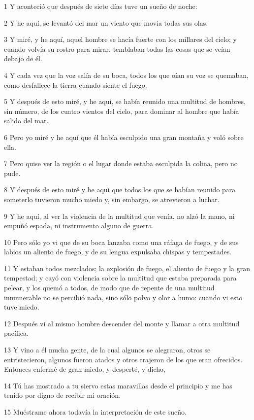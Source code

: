 \par 1 Y aconteció que después de siete días tuve un sueño de noche:
\par 2 Y he aquí, se levantó del mar un viento que movía todas sus olas.
\par 3 Y miré, y he aquí, aquel hombre se hacía fuerte con los millares del cielo; y cuando volvía su rostro para mirar, temblaban todas las cosas que se veían debajo de él.
\par 4 Y cada vez que la voz salía de su boca, todos los que oían su voz se quemaban, como desfallece la tierra cuando siente el fuego.
\par 5 Y después de esto miré, y he aquí, se había reunido una multitud de hombres, sin número, de los cuatro vientos del cielo, para dominar al hombre que había salido del mar.
\par 6 Pero yo miré y he aquí que él había esculpido una gran montaña y voló sobre ella.
\par 7 Pero quise ver la región o el lugar donde estaba esculpida la colina, pero no pude.
\par 8 Y después de esto miré y he aquí que todos los que se habían reunido para someterlo tuvieron mucho miedo y, sin embargo, se atrevieron a luchar.
\par 9 Y he aquí, al ver la violencia de la multitud que venía, no alzó la mano, ni empuñó espada, ni instrumento alguno de guerra.
\par 10 Pero sólo yo vi que de su boca lanzaba como una ráfaga de fuego, y de sus labios un aliento de fuego, y de su lengua expulsaba chispas y tempestades.
\par 11 Y estaban todos mezclados; la explosión de fuego, el aliento de fuego y la gran tempestad; y cayó con violencia sobre la multitud que estaba preparada para pelear, y los quemó a todos, de modo que de repente de una multitud innumerable no se percibió nada, sino sólo polvo y olor a humo: cuando vi esto tuve miedo.
\par 12 Después vi al mismo hombre descender del monte y llamar a otra multitud pacífica.
\par 13 Y vino a él mucha gente, de la cual algunos se alegraron, otros se entristecieron, algunos fueron atados y otros trajeron de los que eran ofrecidos. Entonces enfermé de gran miedo, y desperté, y dicho,
\par 14 Tú has mostrado a tu siervo estas maravillas desde el principio y me has tenido por digno de recibir mi oración.
\par 15 Muéstrame ahora todavía la interpretación de este sueño.
